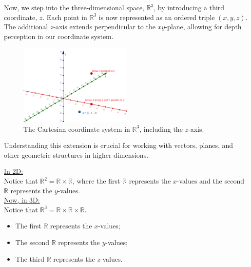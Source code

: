 \documentclass{article}
\begin{document}
\begin{conceptbox}
Now, we step into the three-dimensional space, \( \mathbb{R}^3 \), by introducing a third coordinate, \( z \). Each point in \( \mathbb{R}^3 \) is now represented as an ordered triple \( (x, y, z) \). The additional \( z \)-axis extends perpendicular to the \( xy \)-plane, allowing for depth perception in our coordinate system.

\begin{blankbox}
    \begin{figure}[H]
        \centering
        \includegraphics[width=0.5\textwidth]{cartesian plane in 3D.png}
        \caption{The Cartesian coordinate system in \( \mathbb{R}^3 \), including the \( z \)-axis.}
        \label{fig:3d_cartesian}
    \end{figure}
\end{blankbox}

Understanding this extension is crucial for working with vectors, planes, and other geometric structures in higher dimensions.
\end{conceptbox}

\begin{notebox}
\underline{In 2D:} \\
Notice that \( \mathbb{R}^2 = \mathbb{R} \times \mathbb{R} \), where the first \( \mathbb{R} \) represents the \( x \)-values and the second \( \mathbb{R} \) represents the \( y \)-values.
\\
\underline{Now, in 3D:} \\
Notice that \( \mathbb{R}^3 = \mathbb{R} \times \mathbb{R} \times \mathbb{R} \).
\begin{itemize}
    \item The first \( \mathbb{R} \) represents the \( x \)-values;
    \item The second \( \mathbb{R} \) represents the \( y \)-values;
    \item The third \( \mathbb{R} \) represents the \( z \)-values.
\end{itemize}
\end{notebox}
\end{document}
